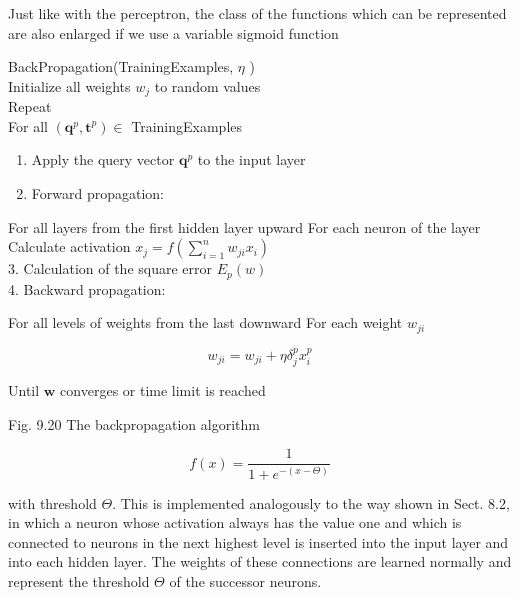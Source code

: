 \documentclass[10pt]{article}
\begin{document}
Just like with the perceptron, the class of the functions which can be represented are also enlarged if we use a variable sigmoid function

BackPropagation(TrainingExamples, $\eta$ )\\
Initialize all weights $w_{j}$ to random values\\
Repeat\\
For all $\left(\boldsymbol{q}^{p}, \boldsymbol{t}^{p}\right) \in$ TrainingExamples

\begin{enumerate}
  \item Apply the query vector $\boldsymbol{q}^{p}$ to the input layer
  \item Forward propagation:
\end{enumerate}

For all layers from the first hidden layer upward For each neuron of the layer Calculate activation $x_{j}=f\left(\sum_{i=1}^{n} w_{j i} x_{i}\right)$\\
3. Calculation of the square error $E_{p}(w)$\\
4. Backward propagation:

For all levels of weights from the last downward For each weight $w_{j i}$

$$
w_{j i}=w_{j i}+\eta \delta_{j}^{p} x_{i}^{p}
$$

Until $\boldsymbol{w}$ converges or time limit is reached

Fig. 9.20 The backpropagation algorithm

$$
f(x)=\frac{1}{1+e^{-(x-\Theta)}}
$$

with threshold $\Theta$. This is implemented analogously to the way shown in Sect. 8.2, in which a neuron whose activation always has the value one and which is connected to neurons in the next highest level is inserted into the input layer and into each hidden layer. The weights of these connections are learned normally and represent the threshold $\Theta$ of the successor neurons.


\end{document}
